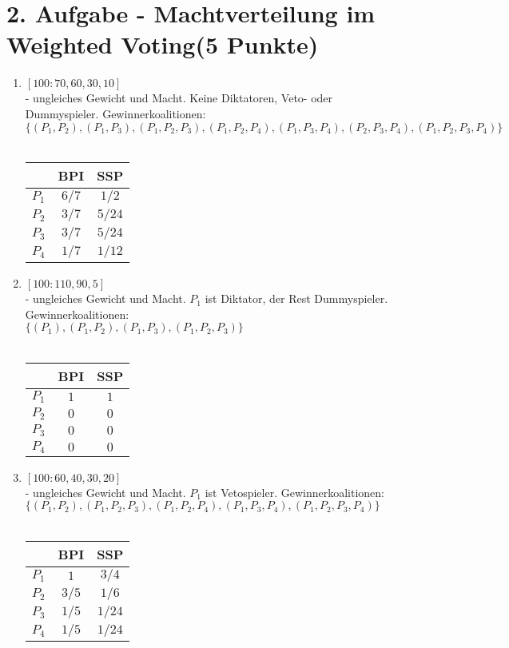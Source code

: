 \documentclass[a4paper, 11pt]{article}
\begin{document}
\section*{2. Aufgabe - Machtverteilung im Weighted Voting\hfill {\small (5 Punkte)}}
\begin{enumerate}

\item 
$[100: 70, 60, 30, 10]$\\
- ungleiches Gewicht und Macht. Keine Diktatoren, Veto- oder Dummyspieler. Gewinnerkoalitionen:\\
$\{(P_1,P_2), (P_1,P_3), (P_1,P_2,P_3), (P_1,P_2,P_4), (P_1,P_3,P_4), (P_2,P_3,P_4), (P_1,P_2,P_3,P_4)\}$\\\\
\begin{tabular}{c | c | c}
  &  BPI & SSP\\ \hline
  $P_1$ & $6/7$ & $1/2$ \\ \hline
  $P_2$ & $3/7$ & $5/24$ \\ \hline
  $P_3$ & $3/7$ & $5/24$ \\ \hline
  $P_4$ & $1/7$ & $1/12$ \\ \hline
\end{tabular}

\item$[100: 110, 90, 5]$\\
- ungleiches Gewicht und Macht. $P_1$ ist Diktator, der Rest Dummyspieler. Gewinnerkoalitionen:\\
$\{(P_1), (P_1,P_2), (P_1,P_3), (P_1,P_2,P_3)\}$\\\\
\begin{tabular}{c | c | c}
  &  BPI & SSP\\ \hline
  $P_1$ & $1$ & $1$ \\ \hline
  $P_2$ & $0$ & $0$ \\ \hline
  $P_3$ & $0$ & $0$ \\ \hline
  $P_4$ & $0$ & $0$ \\ \hline
\end{tabular}


\item
$[100: 60, 40, 30, 20]$\\
- ungleiches Gewicht und Macht. $P_1$ ist Vetospieler. Gewinnerkoalitionen:\\
$\{(P_1,P_2), (P_1,P_2,P_3), (P_1,P_2,P_4), (P_1,P_3,P_4), (P_1,P_2,P_3,P_4)\}$\\\\
\begin{tabular}{c | c | c}
  &  BPI & SSP\\ \hline
  $P_1$ & $1$ & $3/4$ \\ \hline
  $P_2$ & $3/5$ & $1/6$ \\ \hline
  $P_3$ & $1/5$ & $1/24$ \\ \hline
  $P_4$ & $1/5$ & $1/24$ \\ \hline
\end{tabular}

\end{enumerate}
\end{document}
